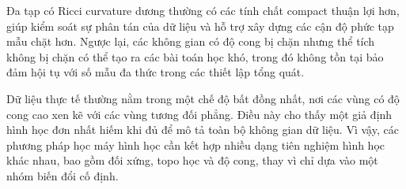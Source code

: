 Đa tạp có Ricci curvature dương thường có các tính chất compact thuận lợi hơn, giúp kiểm soát sự phân tán của dữ liệu và hỗ trợ xây dựng các cận độ phức tạp mẫu chặt hơn. Ngược lại, các không gian có độ cong bị chặn nhưng thể tích không bị chặn có thể tạo ra các bài toán học khó, trong đó không tồn tại bảo đảm hội tụ với số mẫu đa thức trong các thiết lập tổng quát.

Dữ liệu thực tế thường nằm trong một chế độ bất đồng nhất, nơi các vùng có độ cong cao xen kẽ với các vùng tương đối phẳng. Điều này cho thấy một giả định hình học đơn nhất hiếm khi đủ để mô tả toàn bộ không gian dữ liệu. Vì vậy, các phương pháp học máy hình học cần kết hợp nhiều dạng tiên nghiệm hình học khác nhau, bao gồm đối xứng, topo học và độ cong, thay vì chỉ dựa vào một nhóm biến đổi cố định.

\clearpage